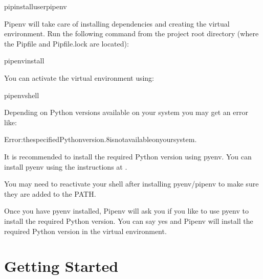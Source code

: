\documentclass[letterpaper,10pt,english]{sphinxmanual}
\begin{document}
\begin{sphinxVerbatim}[commandchars=\\\{\}]
\PYGZdl{}pipinstall\PYGZhy{}\PYGZhy{}userpipenv
\end{sphinxVerbatim}

\sphinxAtStartPar
Pipenv will take care of installing dependencies and creating the virtual environment. Run the following command from the project root directory (where the Pipfile and Pipfile.lock are located):

\begin{sphinxVerbatim}[commandchars=\\\{\}]
\PYGZdl{}pipenvinstall
\end{sphinxVerbatim}

\sphinxAtStartPar
You can activate the virtual environment using:

\begin{sphinxVerbatim}[commandchars=\\\{\}]
\PYGZdl{}pipenvshell
\end{sphinxVerbatim}

\sphinxAtStartPar
Depending on Python versions available on your system you may get an error like:

\begin{sphinxVerbatim}[commandchars=\\\{\}]
Error:thespecifiedPythonversion.8isnotavailableonyoursystem.
\end{sphinxVerbatim}

\sphinxAtStartPar
It is recommended to install the required Python version using pyenv. You can install pyenv using the instructions at .

\sphinxAtStartPar
You may need to reactivate your shell after installing pyenv/pipenv to make sure they are added to the PATH.

\sphinxAtStartPar
Once you have pyenv installed, Pipenv will ask you if you like to use pyenv to install the required Python version. You can say yes and Pipenv will install the required Python version in the virtual environment.

\sphinxstepscope


\chapter{Getting Started}
\label{\detokenize{getting_started:getting-started}}\label{\detokenize{getting_started::doc}}
\end{document}
